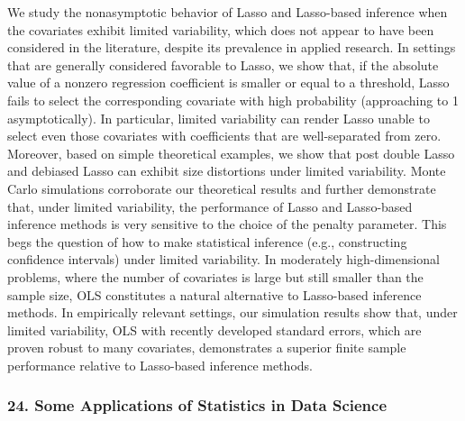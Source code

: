 \begin{itemize}
We study the nonasymptotic behavior of Lasso and Lasso-based inference when the covariates exhibit limited variability, which does not appear to have been considered in the literature, despite its prevalence in applied research. In settings that are generally considered favorable to Lasso, we show that, if the absolute value of a nonzero regression coefficient is smaller or equal to a threshold, Lasso fails to select the corresponding covariate with high probability (approaching to 1 asymptotically). In particular, limited variability can render Lasso unable to select even those covariates with coefficients that are well-separated from zero. Moreover, based on simple theoretical examples, we show that post double Lasso and debiased Lasso can exhibit size distortions under limited variability. Monte Carlo simulations corroborate our theoretical results and further demonstrate that, under limited variability, the performance of Lasso and Lasso-based inference methods is very sensitive to the choice of the penalty parameter. This begs the question of how to make statistical inference (e.g., constructing confidence intervals) under limited variability. In moderately high-dimensional problems, where the number of covariates is large but still smaller than the sample size, OLS constitutes a natural alternative to Lasso-based inference methods. In empirically relevant settings, our simulation results show that, under limited variability, OLS with recently developed standard errors, which are proven robust to many covariates, demonstrates a superior finite sample performance relative to Lasso-based inference methods.

\end{itemize}

\subsubsection*{24. Some Applications of Statistics in Data Science}

